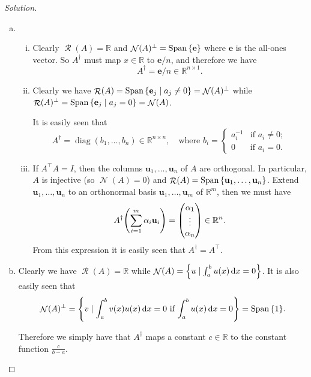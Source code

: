 \documentclass{article}
\theoremstyle{plain}
\theoremstyle{remark}
\newenvironment{solution}{\begin{proof}[Solution]\renewcommand\qedsymbol{}}{\end{proof}}
\renewcommand{\vec}{\mathbf}
\newcommand{\Bb}{\mathbb}
\newcommand{\Cal}{\mathcal}
\newcommand{\RR}{\Bb R}
\newcommand{\T}{^\top} %
\renewcommand{\P}{^\perp}
\newcommand{\D}{^\dagger}
\DeclareMathOperator{\Span}{Span}
\DeclareMathOperator\Nul{\Cal N}
\DeclareMathOperator\Ran{\Cal R}
\DeclareMathOperator\diag{diag}
\begin{document}
\begin{solution}
	\begin{enumerate}[(a)]
		\item \begin{enumerate}[(i)]
			\item Clearly $\Ran(A) = \RR$ and $\Nul(A)\P = \Span\qty{\vec e}$ where $\vec e$ is the all-ones vector. So $A\D$ must map $x \in \RR$ to $\vec e/n$, and therefore we have
			\[
			A\D = \vec e/n \in \RR^{n \times 1}.
			\]
			
			\item Clearly we have $\Ran(A) = \Span\qty{\vec e_j \mid a_j \neq 0} = \Nul(A)\P$ while $\Ran(A)\P = \Span\qty{\vec e_j \mid a_j = 0} = \Nul(A)$. 
			
			It is easily seen that
			\[
			A\D = \diag(b_1, \dotsc, b_n) \in \RR^{n \times n}, \quad\text{where } b_i = \begin{cases}
				a_i^{-1} &\text{if $a_i \neq 0$}; \\
				0 &\text{if $a_i = 0$}. 
			\end{cases}
			\]
			
			\item If $A\T A = I$, then the columns $\vec u_1, \dotsc, \vec u_n$ of $A$ are orthogonal. In particular, $A$ is injective (so $\Nul(A) = \qty{0}$) and $\Ran(A) = \Span\qty{\vec u_1, \dotsc, \vec u_n}$. Extend $\vec u_1, \dotsc, \vec u_n$ to an orthonormal basis $\vec u_1, \dotsc, \vec u_m$ of $\RR^m$, then we must have
			\[
			A\D\qty(\sum_{i=1}^m \alpha_i \vec u_i) = \mqty(\alpha_1 \\ \vdots \\ \alpha_n) \in \RR^n.
			\]
			From this expression it is easily seen that $A\D = A\T$. 
		\end{enumerate}
	
	\item Clearly we have $\Ran(A) = \RR$ while $\Nul(A) = \qty{u \mid \int_a^b u(x) \dd{x} = 0}$. It is also easily seen that 
	\[
	\Nul(A)\P = \qty{v \mid \int_a^b v(x) u(x) \dd{x} = 0 \text{ if $\int_a^b u(x) \dd{x} = 0$}} = \Span\qty{1}. 
	\]
	
	Therefore we simply have that $A\D$ maps a constant $c \in \RR$ to the constant function $\frac{c}{b-a}$. 
	\end{enumerate}
\end{solution}
\end{document}
